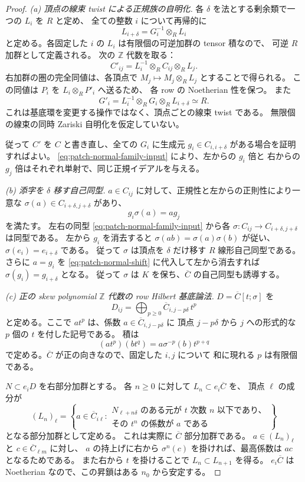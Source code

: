 \begin{proof}
\emph{(a) 頂点の線束 twist による正規族の自明化.}
各 $\delta$ を法とする剰余類で一つの $L_i$ を $R$ と定め、
全ての整数 $i$ について再帰的に
\begin{equation}\label{eq:patch-vertex-lines}
 L_{i+\delta}=G_i^{-1}\otimes_R L_i
\end{equation}
と定める。各固定した $i$ の $L_i$ は有限個の可逆加群の tensor 積なので、
可逆 $R$ 加群として定義される。
次の $\mathbb Z$ 代数を取る：
\[
 C'_{ij}=L_i^{-1}\otimes_R C_{ij}\otimes_R L_j.
\]
右加群の圏の完全同値は、各頂点で
$M_j\mapsto M_j\otimes_R L_j$ とすることで得られる。
この同値は $P_i$ を $L_i\otimes_R P'_i$ へ送るため、
各 row の Noetherian 性を保つ。
また
\[
 G'_i=L_i^{-1}\otimes_R G_i\otimes_R L_{i+\delta}\simeq R.
\]
これは基底環を変更する操作ではなく、頂点ごとの線束 twist である。
無限個の線束の同時 Zariski 自明化を仮定していない。

従って $C'$ を $C$ と書き直し、全ての $G_i$ に生成元
$g_i\in C_{i,i+\delta}$ がある場合を証明すればよい。
\eqref{eq:patch-normal-family-input} により、左からの $g_i$ 倍と
右からの $g_j$ 倍はそれぞれ単射で、同じ正規イデアルを与える。

\emph{(b) 添字を $\delta$ 移す自己同型.}
$a\in C_{ij}$ に対して、正規性と左からの正則性により一意な
$\sigma(a)\in C_{i+\delta,j+\delta}$ があり、
\begin{equation}\label{eq:patch-normal-shift}
 g_i\sigma(a)=a g_j
\end{equation}
を満たす。
左右の同型 \eqref{eq:patch-normal-family-input} から各 $\sigma:C_{ij}\to C_{i+\delta,j+\delta}$ は同型である。
左から $g_i$ を消去すると
$\sigma(ab)=\sigma(a)\sigma(b)$ が従い、$\sigma(e_i)=e_{i+\delta}$ である。
従って $\sigma$ は頂点を $\delta$ だけ移す $R$ 線形自己同型である。
さらに $a=g_i$ を \eqref{eq:patch-normal-shift} に代入して左から消去すれば
$\sigma(g_i)=g_{i+\delta}$ となる。
従って $\sigma$ は $K$ を保ち、$\overline C$ の自己同型も誘導する。

\emph{(c) 正の skew polynomial $\mathbb Z$ 代数の row Hilbert 基底論法.}
$D=\overline C[t;\sigma]$ を
\[
 D_{ij}=\bigoplus_{p\geq0}\overline C_{i,j-p\delta}\,t^p
\]
と定める。ここで $a t^p$ は、係数 $a\in\overline C_{i,j-p\delta}$ に
頂点 $j-p\delta$ から $j$ への形式的な $p$ 個の $t$ を付した記号である。
積は
\[
 (a t^p)(b t^q)=a\sigma^{-p}(b)t^{p+q}
\]
で定める。$\overline C$ が正の向きなので、固定した $i,j$ について
和に現れる $p$ は有限個である。

$N\subset e_iD$ を右部分加群とする。
各 $n\geq0$ に対して $L_n\subset e_i\overline C$ を、
頂点 $\ell$ の成分が
\[
 (L_n)_\ell=
 \left\{a\in\overline C_{i\ell}:
 \begin{array}{l}
 N_{\ell+n\delta}\text{ のある元が }t\text{ 次数 }n\text{ 以下であり、}\\
 \text{その }t^n\text{ の係数が }a\text{ である}
 \end{array}\right\}
\]
となる部分加群として定める。
これは実際に $\overline C$ 部分加群である。
$a\in(L_n)_\ell$ と $c\in\overline C_{\ell m}$ に対し、
$a$ の持上げに右から $\sigma^n(c)$ を掛ければ、最高係数は $ac$ となるためである。
また右から $t$ を掛けることで $L_n\subset L_{n+1}$ を得る。
$e_i\overline C$ は Noetherian なので、この昇鎖はある $n_0$ から安定する。


\end{proof}
